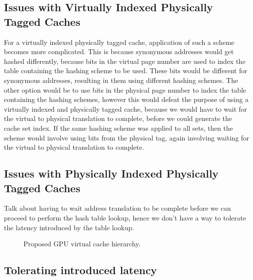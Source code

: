 \subsection{Issues with Virtually Indexed Physically Tagged Caches}
For a virtually indexed physically tagged cache, application of such a scheme becomes more complicated. This is because synonymous addresses would get hashed differently, because bits in the virtual page number are used to index the table containing the hashing scheme to be used. These bits would be different for synonymous addresses, resulting in them using different hashing schemes. The other option would be to use bits in the physical page number to index the table containing the hashing schemes, however this would defeat the purpose of using a virtually indexed and physically tagged cache, because we would have to wait for the virtual to physical translation to complete, before we could generate the cache set index. If the same hashing scheme was applied to all sets, then the scheme would involve using bits from the physical tag, again involving waiting for the virtual to physical translation to complete. 
\subsection{Issues with Physically Indexed Physically Tagged Caches}
Talk about having to wait address translation to be complete before we can 
proceed to perform the hash table lookup, hence we don't have a way to tolerate the latency
introduced by the table lookup. 
\begin{figure}
  \caption{Proposed GPU virtual cache hierarchy.}
  \label{figure:VCDSR_GPU}
\end{figure}
\subsection{Tolerating introduced latency}
